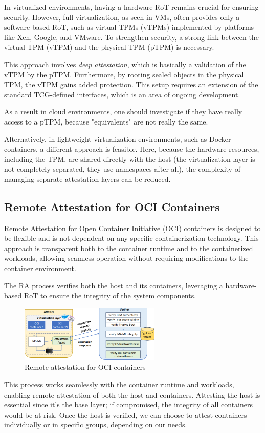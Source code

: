 In virtualized environments, having a hardware RoT remains crucial for
ensuring security. However, full virtualization, as seen in VMs, often
provides only a software-based RoT, such as virtual TPMs (vTPMs)
implemented by platforms like Xen, Google, and VMware. To strengthen
security, a strong link between the virtual TPM (vTPM) and the
physical TPM (pTPM) is necessary.

This approach involves \textit{deep attestation}, which is basically a
validation of the vTPM by the pTPM. Furthermore, by rooting sealed
objects in the physical TPM, the vTPM gains added protection. This
setup requires an extension of the standard TCG-defined interfaces,
which is an area of ongoing development.

\begin{boxH}
  As a result in cloud environments, one should investigate if they
  have really access to a pTPM, because "equivalents" are not 
  really the same.
\end{boxH}

Alternatively, in lightweight virtualization environments, such as
Docker containers, a different approach is feasible. Here, because the
hardware resources, including the TPM, are shared directly with the
host (the virtualization layer is not completely separated, they use
namespaces after all), the complexity of managing separate attestation
layers can be reduced.

\subsection{Remote Attestation for OCI Containers}

Remote Attestation for Open Container Initiative (OCI) containers
is designed to be flexible and is not dependent on any specific
containerization technology. This approach is transparent both to the
container runtime and to the containerized workloads, allowing
seamless operation without requiring modifications to the container
environment.

The RA process verifies both the host and its containers, leveraging a
hardware-based RoT to ensure the integrity of the system components.

\begin{figure}[H]
  \centering
  \includegraphics[width=0.6\textwidth]{img/container OCI .png}
  \caption{Remote attestation for OCI containers}
\end{figure}
This process works seamlessly with the container runtime and
workloads, enabling remote attestation of both the host and
containers. Attesting the host is essential since it's the base layer;
if compromised, the integrity of all containers would be at risk. Once
the host is verified, we can choose to attest containers individually
or in specific groups, depending on our needs.

